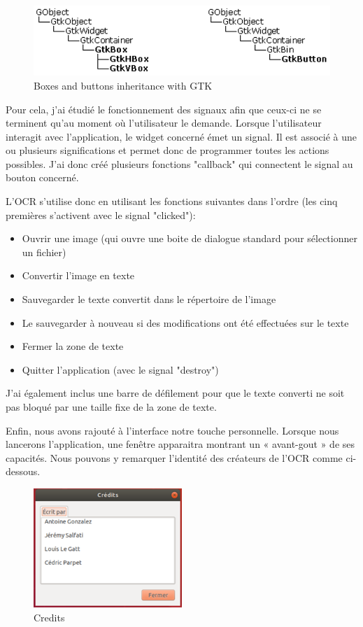 \documentclass[12pt]{report}
\begin{document}
\begin{figure}[H]
    \centering
    \includegraphics[width=1\textwidth]{GTK2}
    \caption{Boxes and buttons inheritance with GTK}
\end{figure}

Pour cela, j’ai étudié le fonctionnement des signaux afin que ceux-ci ne se terminent qu’au moment où l’utilisateur le demande. Lorsque l’utilisateur interagit avec l’application, le widget concerné émet un signal. Il est associé à une ou plusieurs significations et permet donc de programmer toutes les actions possibles. J’ai donc créé plusieurs fonctions "callback" qui connectent le signal au bouton concerné. 

\newpage

L'OCR s'utilise donc en utilisant les fonctions suivantes dans l'ordre (les cinq premières s’activent avec le signal "clicked"):

\begin{itemize}[label=\textbullet]
	\item Ouvrir une image (qui ouvre une boite de dialogue standard pour sélectionner un fichier)
	\item Convertir l'image en texte
	\item Sauvegarder le texte convertit dans le répertoire de l'image
	\item Le sauvegarder à nouveau si des modifications ont été effectuées sur le texte
	\item Fermer la zone de texte
	\item Quitter l'application (avec le signal "destroy")
\end{itemize}

J’ai également inclus une barre de défilement pour que le texte converti ne soit pas bloqué par une taille fixe de la zone de texte.

Enfin, nous avons rajouté à l’interface notre touche personnelle. Lorsque nous lancerons l’application, une fenêtre apparaitra montrant un « avant-gout » de ses capacités. Nous pouvons y remarquer l’identité des créateurs de l’OCR comme ci-dessous.

\begin{figure}[H]
    \centering
    \includegraphics[width=0.5\textwidth]{credits}
    \caption{Credits}
\end{figure}
\end{document}
